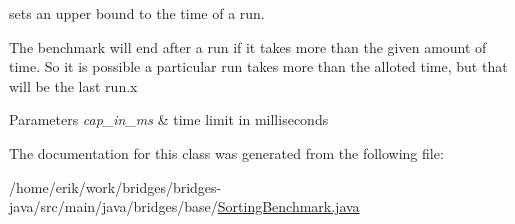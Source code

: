 sets an upper bound to the time of a run. 

The benchmark will end after a run if it takes more than the given amount of time. So it is possible a particular run takes more than the alloted time, but that will be the last run.\+x


\begin{DoxyParams}{Parameters}
{\em cap\+\_\+in\+\_\+ms} & time limit in milliseconds \\
\hline
\end{DoxyParams}


The documentation for this class was generated from the following file\+:\begin{DoxyCompactItemize}
\item 
/home/erik/work/bridges/bridges-\/java/src/main/java/bridges/base/\hyperlink{_sorting_benchmark_8java}{Sorting\+Benchmark.\+java}\end{DoxyCompactItemize}
